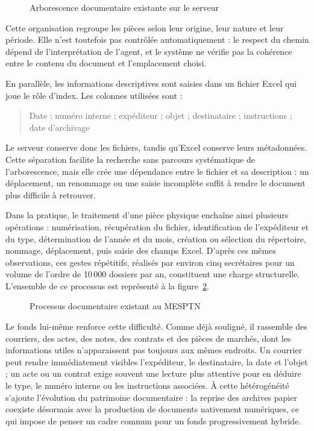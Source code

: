 \documentclass[12pt,a4paper]{report}
\begin{document}
\begin{figure}[H]
\centering

\caption{Arborescence documentaire existante sur le serveur}
\label{fig:arborescence-existante}
\end{figure}

Cette organisation regroupe les pièces selon leur origine, leur nature et leur période. Elle n'est toutefois pas contrôlée automatiquement : le respect du chemin dépend de l'interprétation de l'agent, et le système ne vérifie pas la cohérence entre le contenu du document et l'emplacement choisi.

En parallèle, les informations descriptives sont saisies dans un fichier Excel qui joue le rôle d'index. Les colonnes utilisées sont :
\begin{quote}
Date ; numéro interne ; expéditeur ; objet ; destinataire ; instructions ; date d'archivage
\end{quote}
Le serveur conserve donc les fichiers, tandis qu'Excel conserve leurs métadonnées. Cette séparation facilite la recherche sans parcours systématique de l'arborescence, mais elle crée une dépendance entre le fichier et sa description : un déplacement, un renommage ou une saisie incomplète suffit à rendre le document plus difficile à retrouver.

Dans la pratique, le traitement d'une pièce physique enchaîne ainsi plusieurs opérations : numérisation, récupération du fichier, identification de l'expéditeur et du type, détermination de l'année et du mois, création ou sélection du répertoire, nommage, déplacement, puis saisie des champs Excel. D'après ces mêmes observations, ces gestes répétitifs, réalisés par environ cinq secrétaires pour un volume de l'ordre de 10\,000 dossiers par an, constituent une charge structurelle. L'ensemble de ce processus est représenté à la figure~\ref{fig:processus-documentaire-existant}.

\begin{figure}[H]
\centering
\resizebox{\textwidth}{!}{}
\caption{Processus documentaire existant au MESPTN}
\label{fig:processus-documentaire-existant}
\end{figure}

Le fonds lui-même renforce cette difficulté. Comme déjà souligné, il rassemble des courriers, des actes, des notes, des contrats et des pièces de marchés, dont les informations utiles n'apparaissent pas toujours aux mêmes endroits. Un courrier peut rendre immédiatement visibles l'expéditeur, le destinataire, la date et l'objet ; un acte ou un contrat exige souvent une lecture plus attentive pour en déduire le type, le numéro interne ou les instructions associées. À cette hétérogénéité s'ajoute l'évolution du patrimoine documentaire : la reprise des archives papier coexiste désormais avec la production de documents nativement numériques, ce qui impose de penser un cadre commun pour un fonds progressivement hybride.
\end{document}
